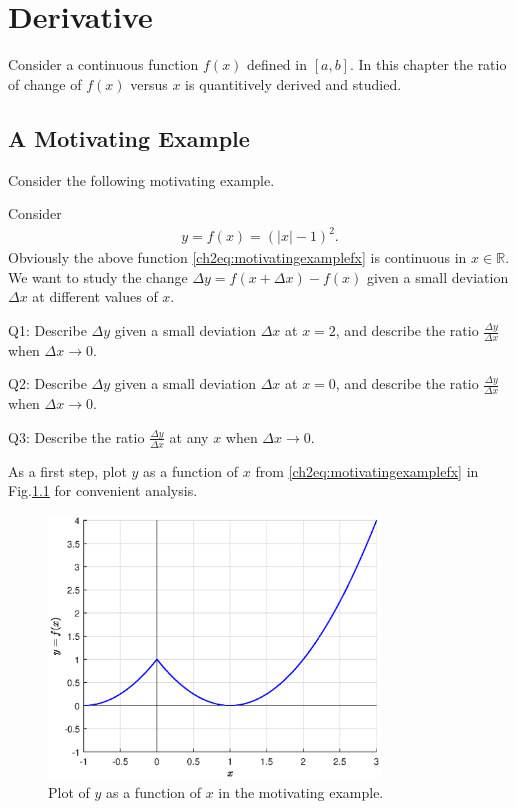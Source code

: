 \chapter{Derivative}

Consider a continuous function $f(x)$ defined in $\left[a,b\right]$. In this chapter the ratio of change of $f(x)$ versus $x$ is quantitively derived and studied.

\section{A Motivating Example}

Consider the following motivating example.

\begin{shortbox}

Consider
\begin{eqnarray}
  y = f(x) = \left(|x|-1\right)^2. \label{ch2eq:motivatingexamplefx}
\end{eqnarray}
Obviously the above function \eqref{ch2eq:motivatingexamplefx} is continuous in $x\in\mathbb{R}$. We want to study the change $\Delta y = f\left(x+\Delta x\right) - f(x)$ given a small deviation $\Delta x$ at different values of $x$.

Q1: Describe $\Delta y$ given a small deviation $\Delta x$ at $x=2$, and describe the ratio $\frac{\Delta y}{\Delta x}$ when $\Delta x \rightarrow 0$.

Q2: Describe $\Delta y$ given a small deviation $\Delta x$ at $x=0$, and describe the ratio $\frac{\Delta y}{\Delta x}$ when $\Delta x \rightarrow 0$.

Q3: Describe the ratio $\frac{\Delta y}{\Delta x}$ at any $x$ when $\Delta x \rightarrow 0$.
\end{shortbox}

As a first step, plot $y$ as a function of $x$ from \eqref{ch2eq:motivatingexamplefx} in Fig.\ref{ch2fig:fxsimpleexample} for convenient analysis.
\begin{figure}
\centering
\includegraphics[width=250pt]{chapters/part-1/figures/fig_derivative_motiexp.eps}
\caption{Plot of $y$ as a function of $x$ in the motivating example.} \label{ch2fig:fxsimpleexample}
\end{figure}

